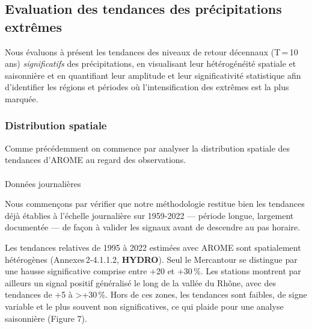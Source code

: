 \documentclass[
  article,
  nofooter,
  noheadings]{jss}
\makeatletter
\let\oldparagraph\paragraph
\renewcommand{\paragraph}{
    \@ifstar
      \xxxParagraphStar
      \xxxParagraphNoStar
  }
\newcommand{\xxxParagraphStar}[1]{\oldparagraph*{#1}\mbox{}}
\newcommand{\xxxParagraphNoStar}[1]{\oldparagraph{#1}\mbox{}}
\makeatother
\begin{document}
\subsection{Evaluation des tendances des précipitations
extrêmes}\label{evaluation-des-tendances-des-pruxe9cipitations-extruxeames}

Nous évaluons à présent les tendances des niveaux de retour décennaux
(T\,=\,10\,ans) \emph{significatifs} des précipitations, en visualisant
leur hétérogénéité spatiale et saisonnière et en quantifiant leur
amplitude et leur significativité statistique afin d'identifier les
régions et périodes où l'intensification des extrêmes est la plus
marquée.

\subsubsection{Distribution spatiale}\label{distribution-spatiale-1}

Comme précédemment on commence par analyser la distribution spatiale des
tendances d'AROME au regard des observations.

\paragraph{Données journalières}\label{donnuxe9es-journaliuxe8res}

Nous commençons par vérifier que notre méthodologie restitue bien les
tendances déjà établies à l'échelle journalière sur 1959‑2022 ---
période longue, largement documentée --- de façon à valider les signaux
avant de descendre au pas horaire.

Les tendances relatives de 1995 à 2022 estimées avec AROME sont
spatialement hétérogènes (Annexes\,2‑4.1.1.2, \textbf{HYDRO}). Seul le
Mercantour se distingue par une hausse significative comprise entre +20
et +30\,\%. Les stations montrent par ailleurs un signal positif
généralisé le long de la vallée du Rhône, avec des tendances de +5 à
\textgreater+30\,\%. Hors de ces zones, les tendances sont faibles, de
signe variable et le plus souvent non significatives, ce qui plaide pour
une analyse saisonnière (Figure 7).

\setlength{\tabcolsep}{0pt}
\end{document}
